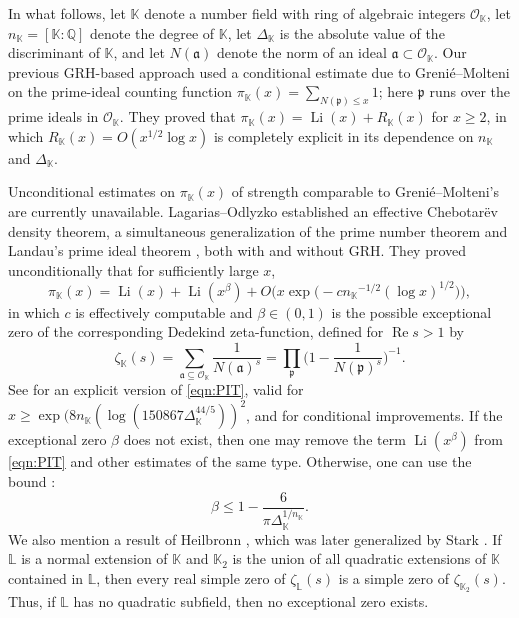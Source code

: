 \documentclass[10pt,reqno]{amsart}
\theoremstyle{plain}
\theoremstyle{definition}
\newcommand{\Q}{\mathbb{Q}}
\newcommand{\K}{\mathbb{K}}
\newcommand{\PP}{\mathfrak{p}}
\renewcommand{\O}{\mathcal{O}}
\newcommand{\Li}{\operatorname{Li}}
\renewcommand{\Re}{\operatorname{Re}}
\begin{document}
In what follows, let $\K$ denote a number field with ring of algebraic integers $\O_{\K}$,
let $n_{\K} = [\K : \Q]$ denote the degree of $\K$, let $\Delta_{\K}$ is the absolute value of the discriminant of $\K$,
and let $N(\mathfrak{a})$ denote the norm of an ideal $\mathfrak{a}\subset\O_{\K}$.
Our previous GRH-based approach used a conditional estimate due to Greni\'e--Molteni \cite[Cor.~1]{Grenie2019} 
on the prime-ideal counting function $\pi_{\K}(x) = \sum_{N(\PP)\leq x} 1$;
here  $\PP$ runs over the prime ideals in $\O_{\K}$.  They proved that
$\pi_{\K}(x) = \Li(x) + R_{\K}(x)$ for $x \geq 2$,
in which $R_{\K}(x) = O( x^{1/2}\log x)$ is completely explicit in its dependence on 
$n_{\K}$ and $\Delta_{\K}$.

Unconditional estimates on $\pi_{\K}(x)$ of strength comparable to Greni\'e--Molteni's are currently unavailable.
Lagarias--Odlyzko \cite[Thm.~1.1, Thm.~1.3]{LagariasOdlyzko} established 
an effective Chebotar\"{e}v density theorem,
a simultaneous generalization of the prime number theorem \cite{de1896fonction, hadamard1896distribution} and Landau's prime ideal theorem \cite{Landau}, both with and without GRH.
They proved unconditionally that for sufficiently large $x$,
\begin{equation}\label{eqn:PIT}
    \pi_{\K}(x) = \Li(x) + \Li(x^\beta) + O\big(x\exp\big(- c {n_{\K}}^{-1/2}(\log{x})^{1/2}\big)\big),
\end{equation}
in which $c$ is effectively computable and $\beta\in (0,1)$ is the possible exceptional zero 
of the corresponding Dedekind zeta-function, defined for $\Re{s} > 1$ by
\begin{equation}\label{eq:DedekindZeta}
\zeta_{\K}(s) = \sum_{\mathfrak{a} \subseteq \O_{\K}} \frac{1}{N(\mathfrak{a})^s}
= \prod_{\PP} \bigg(1 - \frac{1}{N(\PP)^s}\bigg)^{-1}.
\end{equation}
See \cite{Winckler} for an explicit version of \eqref{eqn:PIT}, valid for $x \geq \exp(8 n_{\K}( \log(150867\Delta_{\K}^{44/5}))^2$,
and \cite{Murty,ThornerZaman} for conditional improvements.
If the exceptional zero $\beta$ does not exist, 
then one may remove the term $\Li(x^\beta)$ from \eqref{eqn:PIT}
and other estimates of the same type. 
Otherwise, one can use the bound \cite[p.~148]{Stark}:
\begin{equation*}
\beta \leq 1 - \frac{6}{\pi \Delta_{\K}^{1/n_{\K}}}.
\end{equation*}
We also mention a result of Heilbronn \cite{Heilbronn}, 
which was later generalized by Stark \cite{StarkBS}. 
If $\mathbb{L}$ is a normal extension of $\K$ and $\K_2$ is the union of all quadratic extensions of $\K$ contained in $\mathbb{L}$,
then every real simple zero of $\zeta_{\mathbb{L}}(s)$ is a simple zero of $\zeta_{\K_2}(s)$. Thus, if $\mathbb{L}$ has no quadratic subfield, then no exceptional zero exists.
\end{document}
